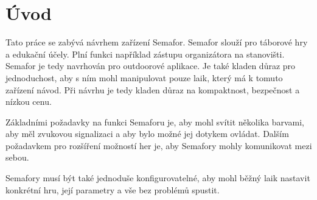 \chapter*{Úvod}
{}

Tato práce se zabývá návrhem zařízení Semafor. Semafor slouží pro táborové hry a edukační účely. Plní funkci například zástupu organizátora 
na stanovišti. 
Semafor je tedy navrhován pro outdoorové aplikace. Je také kladen důraz pro jednoduchost, aby s ním mohl manipulovat pouze laik, který má 
k tomuto zařízení návod. Při návrhu je tedy kladen důraz na kompaktnost, bezpečnost a nízkou cenu. 

Základními požadavky na funkci Semaforu je, aby mohl svítit několika barvami, aby měl zvukovou signalizaci a aby bylo možné jej dotykem ovládat.
Dalším požadavkem pro rozšíření možností her je, aby Semafory mohly komunikovat mezi sebou. 

Semafory musí být také jednoduše konfigurovatelné, aby mohl běžný laik nastavit konkrétní hru, její parametry a vše bez problémů spustit. 



